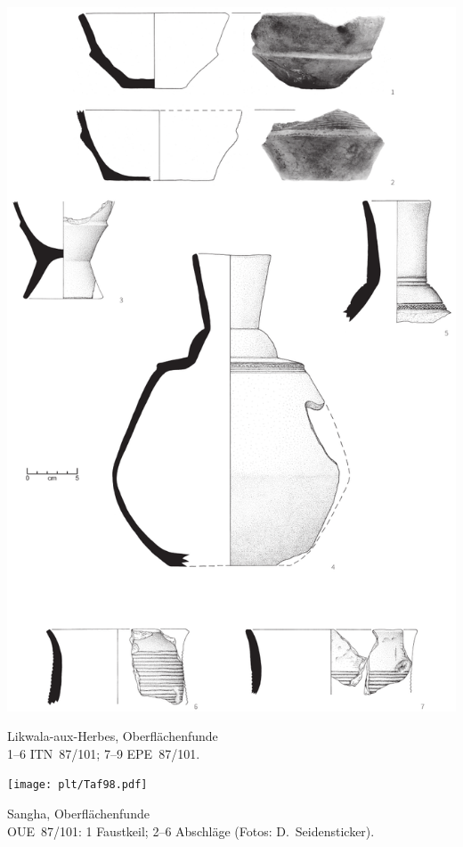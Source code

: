 \begin{pl}[H]
	\includegraphics{plt/Taf97.pdf}
	\vspace{.75em}\caption{Likwala-aux-Herbes, Oberflächenfunde \\ 1--6 ITN~87/101; 7--9 EPE~87/101.}
	\label{pl:97}
\end{pl}

\begin{pl}[H]
	\texttt{[image: plt/Taf98.pdf]}
	\vspace{.75em}\caption{\mbox{Sangha}, Oberflächenfunde \\ OUE~87/101: 1 Faustkeil; 2--6 Abschläge (Fotos: D.~Seidensticker).}
	\label{pl:98}
\end{pl}
